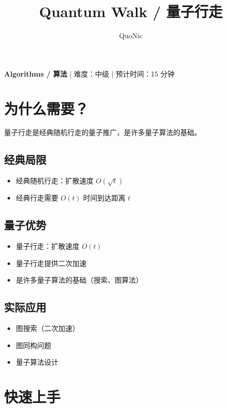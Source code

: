 \documentclass[12pt,a4paper]{article}
\title{Quantum Walk / 量子行走}
\author{QuoNic}
\date{}
\begin{document}
\maketitle

\begin{center}
\textbf{Algorithms / 算法} | 难度：中级 | 预计时间：15 分钟
\end{center}

\tableofcontents
\newpage

\section{为什么需要？}

量子行走是经典随机行走的量子推广，是许多量子算法的基础。

\subsection{经典局限}
\begin{itemize}
  \item 经典随机行走：扩散速度 $O(\sqrt{t})$
  \item 经典行走需要 $O(t)$ 时间到达距离 $t$
\end{itemize}

\subsection{量子优势}
\begin{itemize}
  \item 量子行走：扩散速度 $O(t)$
  \item 量子行走提供二次加速
  \item 是许多量子算法的基础（搜索、图算法）
\end{itemize}

\subsection{实际应用}
\begin{itemize}
  \item 图搜索（二次加速）
  \item 图同构问题
  \item 量子算法设计
\end{itemize}

\section{快速上手}
\end{document}
